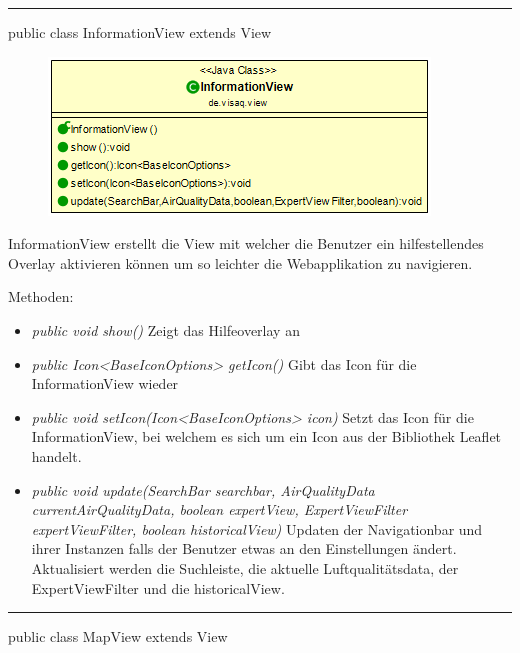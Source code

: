 \rule{\textwidth}{0.4pt} 
public class InformationView extends View

\begin{minipage}{0.4\textwidth}
    \begin{figure}[H]
        \includegraphics[scale = 0.5]{media/frontend/view/de.view/InformationView_Class.png}
    \end{figure}
    \end{minipage} \hfill
    \begin{minipage}{0.4\textwidth}
InformationView erstellt die View mit welcher die Benutzer ein hilfestellendes Overlay aktivieren können um so leichter 
die Webapplikation zu navigieren.
\end{minipage}

Methoden:
\begin{itemize} 
    \item \emph{public void show()} Zeigt das Hilfeoverlay an
    \item \emph{public Icon<BaseIconOptions> getIcon()} Gibt das Icon für die InformationView wieder
    \item \emph{public void setIcon(Icon<BaseIconOptions> icon)} Setzt das Icon für die InformationView, bei welchem es sich um ein Icon aus der Bibliothek \gls{Leaflet} handelt.
    \item \emph{ public void update(SearchBar searchbar, AirQualityData currentAirQualityData, boolean expertView, ExpertViewFilter expertViewFilter, boolean historicalView)} Updaten der Navigationbar und ihrer Instanzen falls der Benutzer etwas an den Einstellungen ändert. Aktualisiert werden die Suchleiste, die aktuelle Luftqualitätsdata, der ExpertViewFilter und die historicalView.
\end{itemize}

\rule{\textwidth}{0.4pt} 
public class MapView extends View

